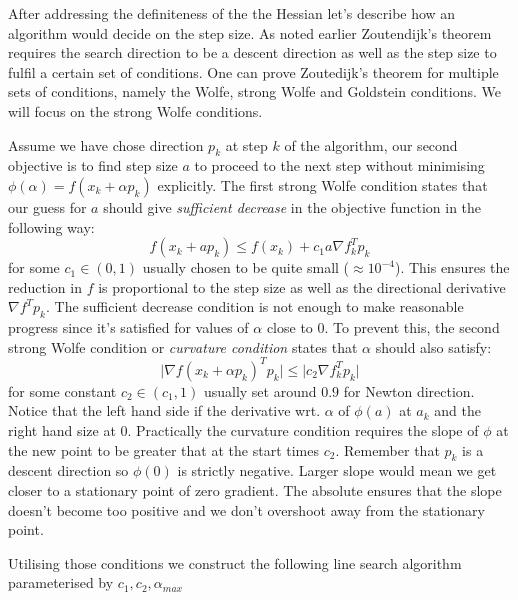 \documentclass{article}
\begin{document}
    After addressing the definiteness of the the Hessian let's describe how an algorithm would decide on the step size.
    As noted earlier Zoutendijk's theorem requires the search direction to be a descent direction as well as the step size to fulfil a certain set of conditions.
    One can prove Zoutedijk's theorem for multiple sets of conditions, namely the Wolfe, strong Wolfe and Goldstein conditions.
    We will focus on the strong Wolfe conditions.

    Assume we have chose direction $p_k$ at step $k$ of the algorithm, our second objective is to find step size $a$ to proceed to the next step without minimising $\phi(\alpha) = f(x_k + \alpha p_k)$ explicitly.
    The first strong Wolfe condition states that our guess for $a$ should give \textit{sufficient decrease} in the objective function in the following way:
    \begin{equation}
        f(x_k + ap_k) \leq f(x_k) + c_1 a \nabla f_k ^T p_k
    \end{equation}
    for some $c_1 \in (0,1)$ usually chosen to be quite small ($\approx 10^{-4}$). This ensures the reduction in $f$ is proportional to the step size as well as the directional derivative $\nabla f ^T p_k$.
    The sufficient decrease condition is not enough to make reasonable progress since it's satisfied for values of $\alpha$ close to 0.
    To prevent this, the second strong Wolfe condition or \textit{curvature condition} states that $\alpha$ should also satisfy:
    \begin{equation}
        \lvert \nabla f(x_k + \alpha p_k )^T p_k \rvert \leq \lvert c_2 \nabla f_k^T p_k \rvert
    \end{equation}
    for some constant $c_2 \in (c_1, 1)$ usually set around $0.9$ for Newton direction.
    Notice that the left hand side if the derivative wrt. $\alpha$ of $\phi(a)$ at $a_k$ and the right hand size at $0$.
    Practically the curvature condition requires the slope of $\phi$ at the new point to be greater that at the start times $c_2$.
    Remember that $p_k$ is a descent direction so $\phi(0)$ is strictly negative.
    Larger slope would mean we get closer to a stationary point of zero gradient.
    The absolute ensures that the slope doesn't become too positive and we don't overshoot away from the stationary point.

    Utilising those conditions we construct the following line search algorithm parameterised by $c_1, c_2, \alpha_{max}$
\end{document}
